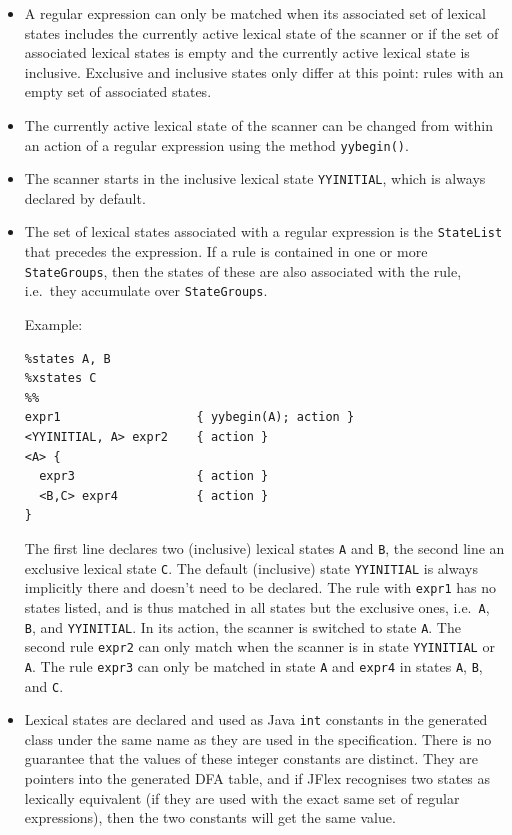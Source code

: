 \documentclass[11pt]{scrartcl}
\begin{document}
\begin{itemize}
\item
A regular expression can only be matched when its associated set of lexical
states includes the currently active lexical state of the scanner or if
the set of associated lexical states is empty and the currently active lexical
state is inclusive. Exclusive and inclusive states only differ at this point: 
rules with an empty set of associated states.
 
\item
The currently active lexical state of the scanner can be changed from within
an action of a regular expression using the method \texttt{yybegin()}.
 

\item
The scanner starts in the inclusive lexical state 
\texttt{YYINITIAL}, which is always declared by default.
 

\item
The set of lexical states associated with a regular expression is 
the \texttt{StateList} that precedes the expression. If a rule is
contained in one or more \texttt{StateGroups}, then the states of
these are also associated with the rule, i.e.~they accumulate over
\texttt{StateGroups}.
  
Example:
\begin{verbatim}
%states A, B
%xstates C
%%
expr1                   { yybegin(A); action }
<YYINITIAL, A> expr2    { action }
<A> {
  expr3                 { action }
  <B,C> expr4           { action }
}
\end{verbatim}
The first line declares two (inclusive) lexical states \texttt{A} and \texttt{B},
the second line an exclusive lexical state \texttt{C}.
The default (inclusive) state \texttt{YYINITIAL} is always implicitly there and
doesn't need to be declared. The rule with \texttt{expr1} has no
states listed, and is thus matched in all states but the exclusive
ones, i.e.~\texttt{A}, \texttt{B}, and \texttt{YYINITIAL}. In its
action, the scanner is switched to state \texttt{A}. The second rule
\texttt{expr2} can only match when the scanner is in state
\texttt{YYINITIAL} or \texttt{A}. The rule \texttt{expr3} can only be
matched in state \texttt{A} and \texttt{expr4} in states \texttt{A}, \texttt{B},
and \texttt{C}.

\item
Lexical states are declared and used as Java \texttt{int} constants in
the generated class under the same name as they are used in the specification.
There is no guarantee that the values of these integer constants are
distinct. They are pointers into the generated DFA table, and if JFlex
recognises two states as lexically equivalent (if they are used with the
exact same set of regular expressions), then the two constants will get
the same value.
 
\end{itemize}
\end{document}
